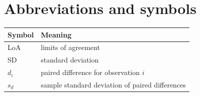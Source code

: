 \chapter*{Abbreviations and symbols}

\begin{tabularx}{\textwidth}{@{}lX@{}}
  \toprule
  Symbol & Meaning \\
  \midrule
  LoA & limits of agreement \\
  SD & standard deviation \\
  $d_i$ & paired difference for observation $i$ \\
  $s_d$ & sample standard deviation of paired differences \\
  \bottomrule
\end{tabularx}
